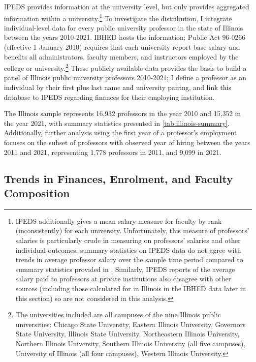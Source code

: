IPEDS provides information at the university level, but only provides aggregated information within a university.\footnote{
    IPEDS additionally gives a mean salary measure for faculty by rank (inconsistently) for each university.
    Unfortunately, this measure of professors' salaries is particularly crude in measuring on professors' salaries and other individual-outcomes; summary statistics on IPEDS data do not agree with trends in average professor salary over the sample time period compared to summary statistics provided in \citealt{aau2021survey}.
    Similarly, IPEDS reports of the average salary paid to professors at private institutions also disagree with other sources (including those calculated for in Illinois in the IBHED data later in this section) so are not considered in this analysis.
}
To investigate the distribution, I integrate individual-level data for every public university professor in the state of Illinois between the years 2010-2021.
IBHED hosts the information;
Public Act 96-0266 (effective 1 January 2010) requires that each university report base salary and benefits all administrators, faculty members, and instructors employed by the college or university.\footnote{
    The universities included are all campuses of the nine Illinois public universities: Chicago State University, Eastern Illinois University, Governors State University, Illinois State University, Northeastern Illinois University, Northern Illinois University, Southern Illinois University  (all five campuses), University of Illinois (all four campuses), Western Illinois University.
}
These publicly available data provides the basis to build a panel of Illinois public university professors 2010-2021; I define a professor as an individual by their first plus last name and university pairing, and link this database to IPEDS regarding finances for their employing institution.

The Illinois sample represents 16,932 professors in the year 2010 and 15,352 in the year 2021, with summary statistics presented in \autoref{tab:illinois-summary}.
Additionally, further analysis using the first year of a professor's employment focuses on the subset of professors with observed year of hiring between the years 2011 and 2021, representing 1,778 professors in 2011, and 9,099 in 2021.

\subsection{Trends in Finances, Enrolment, and Faculty Composition}
\label{sec:trends}

